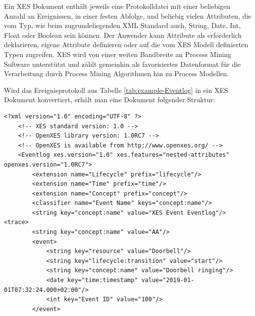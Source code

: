 Ein XES Dokument enthält jeweils eine Protokolldatei mit einer beliebigen Anzahl an Ereignissen, in einer festen Abfolge, und beliebig vielen Attributen, die vom Typ, wie beim zugrundeliegenden XML Standard auch, String, Date, Int, Float oder Boolean sein können. 
Der Anwender kann Attribute als erforderlich deklarieren, eigene Attribute definieren oder auf die vom XES Modell definierten Typen zugreifen. XES  wird von einer weiten Bandbreite an Process Mining Software unterstützt und zählt gemeinhin als favorisiertes Datenformat für die Verarbeitung durch Process Mining Algorithmen hin zu Process Modellen.

Wird das Ereignisprotokoll aus Tabelle \ref{tab:example-Eventlog} in ein XES Dokument konvertiert, erhält man eine Dokument folgender Struktur:
\small
\lstset{language=XML}
\begin{lstlisting}[label=lst:xes]
<?xml version="1.0" encoding="UTF-8" ?>
    <!-- XES standard version: 1.0 -->
    <!-- OpenXES library version: 1.0RC7 -->
    <!-- OpenXES is available from http://www.openxes.org/ -->
    <Eventlog xes.version="1.0" xes.features="nested-attributes" openxes.version="1.0RC7">
    	<extension name="Lifecycle" prefix="lifecycle"/>
    	<extension name="Time" prefix="time"/>
    	<extension name="Concept" prefix="concept"/>
    	<classifier name="Event Name" keys="concept:name"/>
    	<string key="concept:name" value="XES Event Eventlog"/>	<trace>
		<string key="concept:name" value="AA"/>
		<event>
			<string key="resource" value="Doorbell"/>
			<string key="lifecycle:transition" value="start"/>
			<string key="concept:name" value="Doorbell ringing"/>
			<date key="time:timestamp" value="2019-01-01T07:32:24.000+02:00"/>
			<int key="Event ID" value="100"/>
		</event>
	
\end{lstlisting}
\normalsize